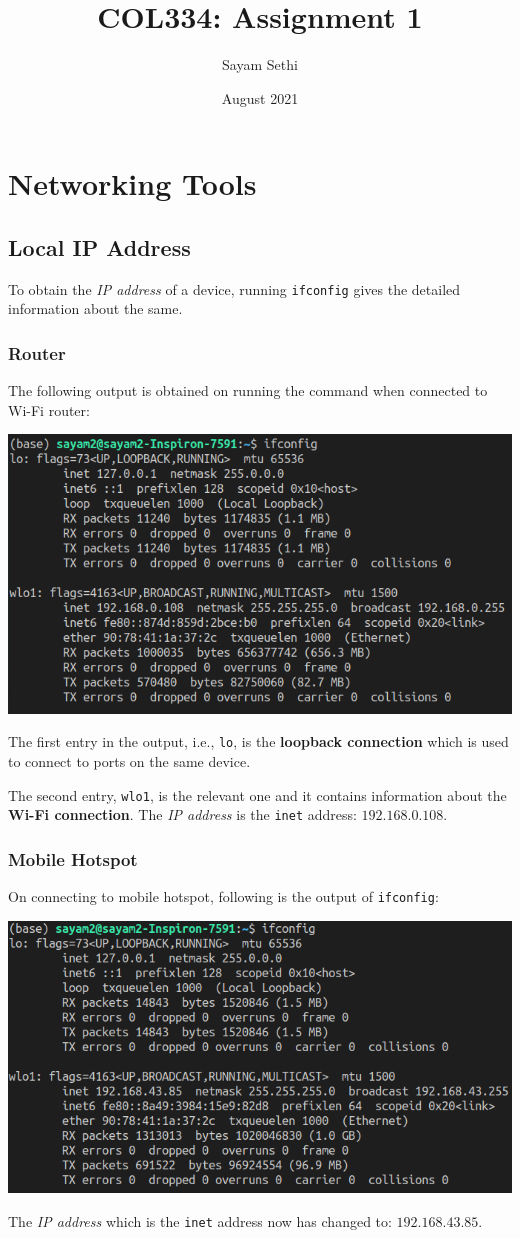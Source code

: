 \documentclass[11pt]{article}
\title{COL334: Assignment 1}
\author{Sayam Sethi}
\date{August 2021}
\begin{document}
\maketitle

\tableofcontents

\section{Networking Tools}

\subsection{Local IP Address}
To obtain the \textit{IP address} of a device, running \texttt{ifconfig} gives the detailed information about the same.

\subsubsection{Router}
The following output is obtained on running the command when connected to Wi-Fi router:
\begin{center}
    \includegraphics[width=0.5\linewidth]{figures/ifconfig_router.png}
\end{center}
The first entry in the output, i.e., \texttt{lo}, is the \textbf{loopback connection} which is used to connect to ports on the same device.\par
The second entry, \texttt{wlo1}, is the relevant one and it contains information about the \textbf{Wi-Fi connection}. The \textit{IP address} is the \texttt{inet} address: $192.168.0.108$.

\subsubsection{Mobile Hotspot}
On connecting to mobile hotspot, following is the output of \texttt{ifconfig}:
\begin{center}
    \includegraphics[width=0.5\linewidth]{figures/ifconfig_hotspot.png}
\end{center}
The \textit{IP address} which is the \texttt{inet} address now has changed to: $192.168.43.85$.
\end{document}
